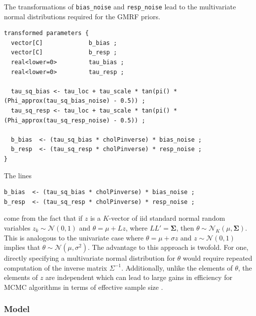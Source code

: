 The transformations of {\tt bias\_noise} and {\tt resp\_noise} lead to the multivariate normal distributions required for the GMRF priors. 

\begin{singlespacing}
\small
\begin{verbatim}
transformed parameters {
  vector[C]             b_bias ;
  vector[C]             b_resp ;
  real<lower=0>         tau_bias ;
  real<lower=0>         tau_resp ;

  tau_sq_bias <- tau_loc + tau_scale * tan(pi() * (Phi_approx(tau_sq_bias_noise) - 0.5)) ;
  tau_sq_resp <- tau_loc + tau_scale * tan(pi() * (Phi_approx(tau_sq_resp_noise) - 0.5)) ;

  b_bias  <- (tau_sq_bias * cholPinverse) * bias_noise ;
  b_resp  <- (tau_sq_resp * cholPinverse) * resp_noise ;
}
\end{verbatim}
\end{singlespacing}

\noindent The lines
%
\begin{singlespacing}
\small
\begin{verbatim}
b_bias  <- (tau_sq_bias * cholPinverse) * bias_noise ; 
b_resp  <- (tau_sq_resp * cholPinverse) * resp_noise ; 
\end{verbatim}
\end{singlespacing}

\noindent come from the fact that if $z$ is a $K$-vector of iid standard normal random variables $z_k \sim \mathcal{N}(0,1)$ and $\theta = \mu + L z$, where $LL' = \boldsymbol{\Sigma}$, then $\theta \sim \mathcal{N}_K (\mu, \boldsymbol{\Sigma})$. This is analogous to the univariate case where $\theta = \mu + \sigma z$ and $z \sim \mathcal{N}(0,1)$ implies that $\theta \sim \mathcal{N}(\mu, \sigma^2)$. The advantage to this approach is twofold. For one, directly specifying a multivariate normal distribution for $\theta$ would require repeated computation of the inverse matrix $\Sigma^{-1}$. Additionally, unlike the elements of $\theta$, the elements of $z$ are independent which can lead to large gains in efficiency for MCMC algorithms in terms of effective sample size . 

\subsubsection{Model}

